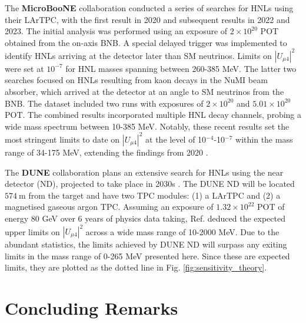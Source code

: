 \begin{coloritemize}
\item The \textbf{MicroBooNE} collaboration conducted a series of searches for HNLs using their LArTPC, with the first result in 2020 and subsequent results in 2022 and 2023.
The initial analysis was performed using an exposure of $2 \times 10^{20}$ POT obtained from the on-axis BNB.
A special delayed trigger was implemented to identify HNLs arriving at the detector later than SM neutrinos.
Limits on $|U_{\mu4}|^{2}$ were set at $10^{-7}$ for HNL masses spanning between 260-385 MeV.
The latter two searches focused on HNLs resulting from kaon decays in the NuMI beam absorber, which arrived at the detector at an angle to SM neutrinos from the BNB.
The dataset included two runs with exposures of $2 \times 10^{20}$ and $5.01 \times 10^{20}$ POT.
The combined results incorporated multiple HNL decay channels, probing a wide mass spectrum between 10-385 MeV.
Notably, these recent results set the most stringent limits to date on $|U_{\mu4}|^{2}$ at the level of 10$^{-4}$-10$^{-7}$ within the mass range of 34-175 MeV, extending the findings from 2020 \cite{uboone1, uboone2, uboone3}.

\item The \textbf{DUNE} collaboration plans an extensive search for HNLs using the near detector (ND), projected to take place in 2030s \cite{DUNEND, HNLSilvia, HNLKelly}.
The DUNE ND will be located $574~\mathrm{m}$ from the target and have two TPC modules: (1) a LArTPC and (2) a magnetised gaseous argon TPC.
Assuming an exposure of $1.32 \times 10^{22}$ POT of energy 80 GeV over 6 years of physics data taking, Ref. \cite{HNLSilvia} deduced the expected upper limits on $|U_{\mu4}|^{2}$ across a wide mass 
range of 10-2000 MeV.
Due to the abundant statistics, the limits achieved by DUNE ND will surpass any exiting limits in the mass range of 0-265 MeV presented here.
Since these are expected limits, they are plotted as the dotted line in Fig. \ref{fig:sensitivity_theory}.

\end{coloritemize}

\section{Concluding Remarks}
\label{sec2conclude}

